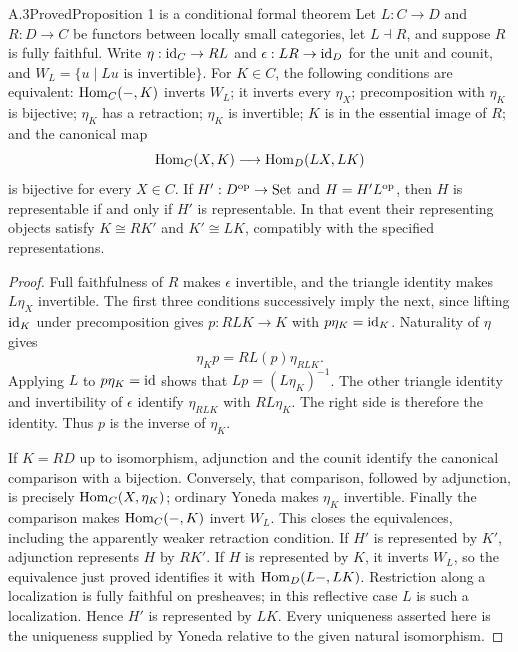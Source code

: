 \begin{claim}{A.3}{Proved}{Proposition 1 is a conditional formal theorem}
Let $L:C\to D$ and $R:D\to C$ be functors between locally small categories, let $L\dashv R$, and suppose $R$ is fully faithful. Write $\eta:\mathrm{id}_C\to RL$ and $\epsilon:LR\to\mathrm{id}_D$ for the unit and counit, and $W_L=\{u\mid Lu\text{ is invertible}\}$. For $K\in C$, the following conditions are equivalent: $\operatorname{Hom}_C(-,K)$ inverts $W_L$; it inverts every $\eta_X$; precomposition with $\eta_K$ is bijective; $\eta_K$ has a retraction; $\eta_K$ is invertible; $K$ is in the essential image of $R$; and the canonical map
\[
 \operatorname{Hom}_C(X,K)\longrightarrow\operatorname{Hom}_D(LX,LK)
\]
is bijective for every $X\in C$. If $H':D^{\mathrm{op}}\to\mathrm{Set}$ and $H=H' L^{\mathrm{op}}$, then $H$ is representable if and only if $H'$ is representable. In that event their representing objects satisfy $K\cong RK'$ and $K'\cong LK$, compatibly with the specified representations.
\end{claim}
\begin{proof}
Full faithfulness of $R$ makes $\epsilon$ invertible, and the triangle identity makes $L\eta_X$ invertible. The first three conditions successively imply the next, since lifting $\mathrm{id}_K$ under precomposition gives $p:RLK\to K$ with $p\eta_K=\mathrm{id}_K$. Naturality of $\eta$ gives
\[
 \eta_Kp=RL(p)\eta_{RLK}.
\]
Applying $L$ to $p\eta_K=\mathrm{id}$ shows that $Lp=(L\eta_K)^{-1}$. The other triangle identity and invertibility of $\epsilon$ identify $\eta_{RLK}$ with $RL\eta_K$. The right side is therefore the identity. Thus $p$ is the inverse of $\eta_K$.

If $K=RD$ up to isomorphism, adjunction and the counit identify the canonical comparison with a bijection. Conversely, that comparison, followed by adjunction, is precisely $\operatorname{Hom}_C(X,\eta_K)$; ordinary Yoneda makes $\eta_K$ invertible. Finally the comparison makes $\operatorname{Hom}_C(-,K)$ invert $W_L$. This closes the equivalences, including the apparently weaker retraction condition. If $H'$ is represented by $K'$, adjunction represents $H$ by $RK'$. If $H$ is represented by $K$, it inverts $W_L$, so the equivalence just proved identifies it with $\operatorname{Hom}_D(L-,LK)$. Restriction along a localization is fully faithful on presheaves; in this reflective case $L$ is such a localization. Hence $H'$ is represented by $LK$. Every uniqueness asserted here is the uniqueness supplied by Yoneda relative to the given natural isomorphism.
\end{proof}

